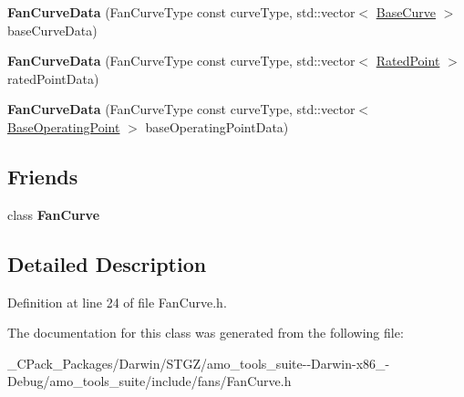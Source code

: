 \begin{DoxyCompactItemize}
{\bfseries Fan\+Curve\+Data} (Fan\+Curve\+Type const curve\+Type, std\+::vector$<$ \hyperlink{struct_fan_curve_data_1_1_base_curve}{Base\+Curve} $>$ base\+Curve\+Data)
\item 
\mbox{\label{class_fan_curve_data_aab50cc3aa6ac0208d02691af715d72bb}} 
{\bfseries Fan\+Curve\+Data} (Fan\+Curve\+Type const curve\+Type, std\+::vector$<$ \hyperlink{struct_fan_curve_data_1_1_rated_point}{Rated\+Point} $>$ rated\+Point\+Data)
\item 
\mbox{\label{class_fan_curve_data_a06a924f8d9b61eabc3fcaf2b32fc9bff}} 
{\bfseries Fan\+Curve\+Data} (Fan\+Curve\+Type const curve\+Type, std\+::vector$<$ \hyperlink{struct_fan_curve_data_1_1_base_operating_point}{Base\+Operating\+Point} $>$ base\+Operating\+Point\+Data)
\end{DoxyCompactItemize}
\subsection*{Friends}
\begin{DoxyCompactItemize}
\item 
\mbox{\label{class_fan_curve_data_a602ac04d4d30425e649d81550cbbc48a}} 
class {\bfseries Fan\+Curve}
\end{DoxyCompactItemize}


\subsection{Detailed Description}


Definition at line 24 of file Fan\+Curve.\+h.



The documentation for this class was generated from the following file\+:\begin{DoxyCompactItemize}
\item 
\+\_\+\+C\+Pack\+\_\+\+Packages/\+Darwin/\+S\+T\+G\+Z/amo\+\_\+tools\+\_\+suite-\/-\/\+Darwin-\/x86\+\_-\/\+Debug/amo\+\_\+tools\+\_\+suite/include/fans/Fan\+Curve.\+h\end{DoxyCompactItemize}
